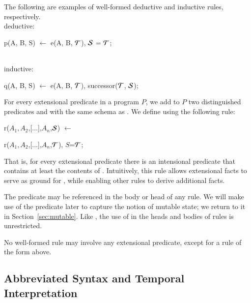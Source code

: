 \begin{example}
The following are examples of well-formed deductive and inductive rules, respectively.
\\
deductive:
\begin{Dedalus}
p(A, B, S) \(\leftarrow\) e(A, B, \(\Tau\)), \(\SDedalus\) = \(\Tau\);
\end{Dedalus}
\\
inductive:
\begin{Dedalus}
q(A, B, S) \(\leftarrow\) e(A, B, \(\Tau\)), successor(\(\Tau\), \(\SDedalus\));
\end{Dedalus}
\end{example}

For every extensional predicate  in a \slang program $P$, we add to
$P$ two distinguished predicates  and  with the same schema
as .  We define  using the following rule:

\begin{dedalus}
r\pos($A_1,A_2$,[...],$A_n$,\(\SDedalus\)) \(\leftarrow\)
\end{dedalus}

\hspace{5mm}
\begin{dedalus}
   r($A_1,A_2$,[...],$A_n$,\(\Tau\)), \(S\)=\(\Tau\);
\end{dedalus}

That is, for every extensional predicate  there is an intensional
predicate  that contains at least the contents of .
Intuitively, this rule allows extensional facts to serve as ground for
, while enabling other rules to derive additional  facts.

The predicate  may be referenced in the body or head of any \slang rule.  
We will make use of the predicate  later to capture the notion of mutable state; we return to it in Section~\ref{sec:mutable}. 
Like , the use of  in the heads and bodies of rules is unrestricted.

\vspace{1.2em}
No well-formed \slang rule may involve any extensional predicate, except for a rule of the form above.




\subsection{Abbreviated Syntax and Temporal Interpretation}

